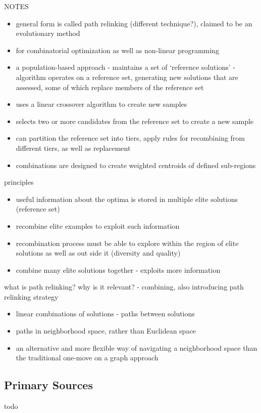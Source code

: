 \documentclass[a4paper, 11pt]{article}
\begin{document}
NOTES
\begin{itemize}
	\item general form is called path relinking (different technique?), claimed to be an evolutionary method
	\item for combinatorial optimization as well as non-linear programming 
	\item a population-based approach - maintains a set of `reference solutions' - algorithm operates on a reference set, generating new solutions that are assessed, some of which replace members of the reference set
	\item uses a linear crossover algorithm to create new samples
	\item selects two or more candidates from the reference set to create a new sample
	\item can partition the reference set into tiers, apply rules for recombining from different tiers, as well as replacement
	\item combinations are designed to create weighted centroids of defined sub-regions
\end{itemize}

principles
\begin{itemize}
	\item useful information about the optima is stored in multiple elite solutions (reference set)
	\item recombine elite examples to exploit such information
	\item recombination process must be able to explore within the region of elite solutions as well as out side it (diversity and quality)
	\item combine many elite solutions together - exploits more information
\end{itemize}

what is path relinking? why is it relevant? \cite{Glover1994a} - combining, also introducing path relinking strategy
\begin{itemize}
	\item linear combinations of solutions - paths between solutions
	\item paths in neighborhood space, rather than Euclidean space
	\item an alternative and more flexible way of navigating a neighborhood space than the traditional one-move on a graph approach
	
\end{itemize}


% 
% 
\subsection{Primary Sources}
todo
\end{document}
